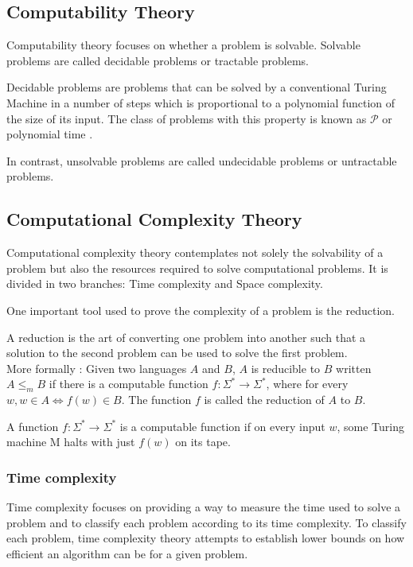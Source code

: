 \subsection{Computability Theory}
Computability theory focuses on whether a problem is solvable. Solvable problems are called decidable problems or tractable problems. 

\begin{defn}
Decidable problems are problems that can be solved by a conventional Turing Machine in a number of steps which is proportional to a polynomial function of the size of its input. The class of problems with this property is known as $\mathcal{P}$  or polynomial time . 
\end{defn}
In contrast, unsolvable problems are called undecidable problems or untractable problems. 

\subsection{Computational Complexity Theory}
Computational complexity theory contemplates not solely the solvability of a problem but also the resources required to solve computational problems. It is divided in two branches: Time complexity and Space complexity. 

One important tool used to prove the complexity of a problem is the reduction. 

\begin{defn}\cite{sipserIntroductionTheoryComputation2006}
A reduction is the art of converting one problem into another such that a solution to the second problem can be used to solve the first problem. \\ 
More formally : 
Given two languages $A$ and $B$, $A$ is reducible to $B$ written $A \leq_m B$ if there is a computable function $f : \Sigma^* \rightarrow \Sigma^*$, where for every $w, w \in A \Longleftrightarrow f(w) \in B$. The function $f$ is called the reduction of $A$ to $B$.  
\end{defn}

\begin{defn}\cite{sipserIntroductionTheoryComputation2006}
A function $f : \Sigma^* \rightarrow \Sigma^*$ is a computable function if on every input $w$, some Turing machine M halts with just $f(w)$ on its tape. 
\end{defn}

\subsubsection{Time complexity}
Time complexity focuses on providing a way to measure the time used to solve a problem and to classify each problem according to its time complexity. To classify each problem, time complexity theory attempts to establish lower bounds on how efficient an algorithm can be for a given problem. 

